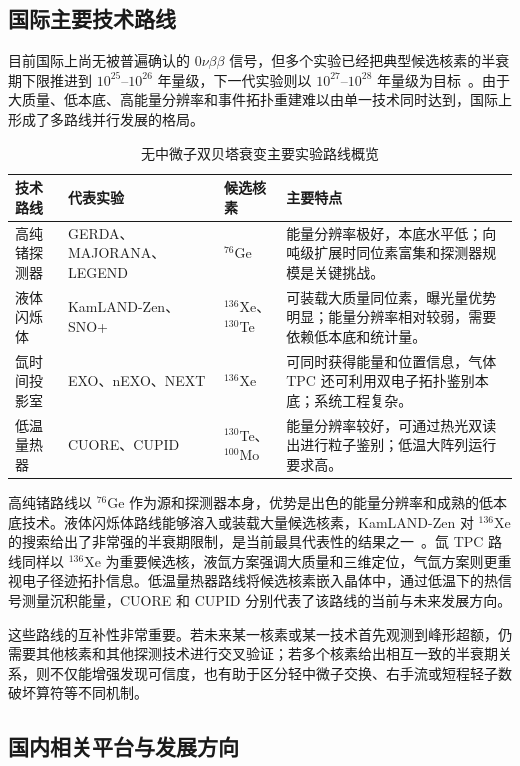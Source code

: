 \documentclass[12pt,a4paper]{ctexart}
\begin{document}
\subsection{国际主要技术路线}

目前国际上尚无被普遍确认的 $0\nu\beta\beta$ 信号，但多个实验已经把典型候选核素的半衰期下限推进到 $10^{25}$--$10^{26}$ 年量级，下一代实验则以 $10^{27}$--$10^{28}$ 年量级为目标~\cite{Dolinski2019,Agostini2023,GomezCadenas2023}。由于大质量、低本底、高能量分辨率和事件拓扑重建难以由单一技术同时达到，国际上形成了多路线并行发展的格局。

\begin{table}[htbp]
	\centering
	\caption{无中微子双贝塔衰变主要实验路线概览}
	\label{tab:experiment-routes}
	\begin{tabularx}{\textwidth}{p{2.8cm}p{2.6cm}p{2.4cm}X}
		\toprule
		技术路线 & 代表实验 & 候选核素 & 主要特点 \\
		\midrule
		高纯锗探测器 & GERDA、MAJORANA、LEGEND & $^{76}$Ge & 能量分辨率极好，本底水平低；向吨级扩展时同位素富集和探测器规模是关键挑战。\\
		液体闪烁体 & KamLAND-Zen、SNO+ & $^{136}$Xe、$^{130}$Te & 可装载大质量同位素，曝光量优势明显；能量分辨率相对较弱，需要依赖低本底和统计量。\\
		氙时间投影室 & EXO、nEXO、NEXT & $^{136}$Xe & 可同时获得能量和位置信息，气体 TPC 还可利用双电子拓扑鉴别本底；系统工程复杂。\\
		低温量热器 & CUORE、CUPID & $^{130}$Te、$^{100}$Mo & 能量分辨率较好，可通过热光双读出进行粒子鉴别；低温大阵列运行要求高。\\
		\bottomrule
	\end{tabularx}
\end{table}

高纯锗路线以 $^{76}$Ge 作为源和探测器本身，优势是出色的能量分辨率和成熟的低本底技术。液体闪烁体路线能够溶入或装载大量候选核素，KamLAND-Zen 对 $^{136}$Xe 的搜索给出了非常强的半衰期限制，是当前最具代表性的结果之一~\cite{GomezCadenas2023}。氙 TPC 路线同样以 $^{136}$Xe 为重要候选核，液氙方案强调大质量和三维定位，气氙方案则更重视电子径迹拓扑信息。低温量热器路线将候选核素嵌入晶体中，通过低温下的热信号测量沉积能量，CUORE 和 CUPID 分别代表了该路线的当前与未来发展方向。

这些路线的互补性非常重要。若未来某一核素或某一技术首先观测到峰形超额，仍需要其他核素和其他探测技术进行交叉验证；若多个核素给出相互一致的半衰期关系，则不仅能增强发现可信度，也有助于区分轻中微子交换、右手流或短程轻子数破坏算符等不同机制。

\subsection{国内相关平台与发展方向}
\end{document}
